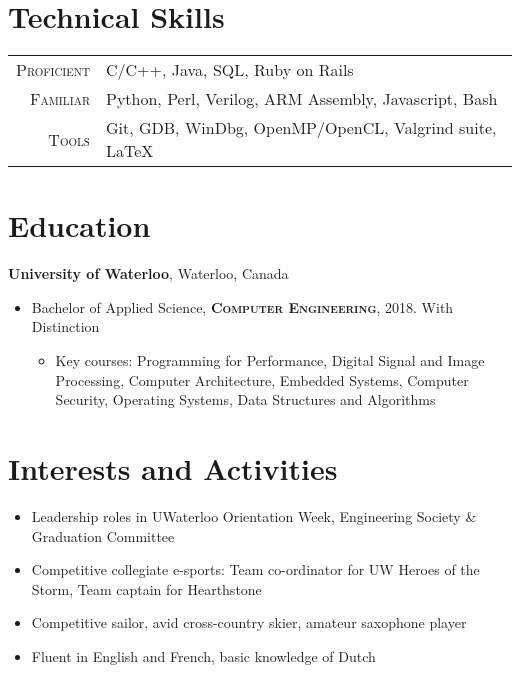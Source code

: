 \documentclass[letterpaper,10pt]{article}
\begin{document}
\begin{minipage}[t]{0.36\textwidth}

\section{Technical Skills}
\medskip

\renewcommand{\arraystretch}{1.8}
\begin{tabularx}{\linewidth}{r | X}

\textsc{Proficient} & C/C++, Java, SQL, Ruby on Rails \\
\textsc{Familiar} & Python, Perl, Verilog, ARM Assembly, Javascript, Bash \\
\textsc{Tools} & Git, GDB, WinDbg, OpenMP/OpenCL, Valgrind suite, \LaTeX \\

\end{tabularx}
\renewcommand{\arraystretch}{1}
\medskip

\section{Education}
\textbf{University of Waterloo}, Waterloo, Canada
\medskip
\begin{itemize}
    \item{Bachelor of Applied Science, \textsc{\textbf{Computer Engineering}}, 2018. With Distinction}
    \begin{itemize}
        \item {\footnotesize{Key courses: Programming for Performance, Digital Signal and Image Processing, Computer Architecture, Embedded Systems, Computer Security, Operating Systems, Data Structures and Algorithms}}
    \end{itemize}
\end{itemize}

\medskip

\section{Interests and Activities}
\medskip
\begin{itemize}
	\item {Leadership roles in UWaterloo Orientation Week, Engineering Society \& Graduation Committee}
	\item {Competitive collegiate e-sports: Team co-ordinator for UW Heroes of the Storm, Team captain for Hearthstone}
	\item {Competitive sailor, avid cross-country skier, amateur saxophone player}
    \item {Fluent in English and French, basic knowledge of Dutch}
\end{itemize}


\end{minipage}
\end{document}
